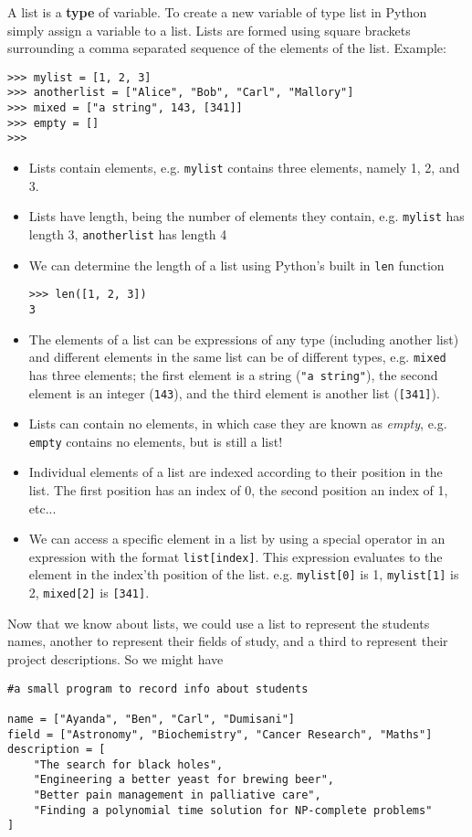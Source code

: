 A list is a \textbf{type} of variable. To create a new   variable of type list in Python simply assign a variable to a list.   Lists are formed using square brackets surrounding a comma separated   sequence of the elements of the list.  Example:
\begin{lstlisting}
>>> mylist = [1, 2, 3]
>>> anotherlist = ["Alice", "Bob", "Carl", "Mallory"]
>>> mixed = ["a string", 143, [341]]
>>> empty = []
>>>
\end{lstlisting}
\begin{itemize}
	\item Lists contain elements, e.g. \texttt{mylist} contains three elements,    namely 1, 2, and 3.
	\item Lists have length, being the number of elements they contain,    e.g. \texttt{mylist} has length 3, \texttt{anotherlist} has length 4
	\item We can determine the length of a list using Python's built in    \texttt{len}    function
\begin{lstlisting}
>>> len([1, 2, 3])
3
\end{lstlisting}
	\item The elements of a list can be expressions of any type    (including another list) and different elements in the same list    can be of different types, e.g. \texttt{mixed} has three elements; the    first element is a string (\texttt{"a string"}), the second element is an    integer (\texttt{143}), and the third element is another list (\texttt{[341]}).
	\item Lists can contain no elements, in which case they are known as    \textit{empty}, e.g. \texttt{empty} contains no elements, but is still a list!
	\item Individual elements of a list are indexed according to their    position in the list. The first position has an index of 0, the    second position an index of 1, etc...
	\item We can access a specific element in a list by using a special    operator in an expression with the format    
\texttt{list[index]}. This expression evaluates to the element    in the index'th position of the list. e.g. 
\texttt{mylist[0]}    is 1, 
\texttt{mylist[1]} is 2, 
\texttt{mixed[2]} is    \texttt{[341]}.
\end{itemize}

Now that we know about lists, we could use a list to represent the   students names, another to represent their fields of study, and a third   to represent their project descriptions. So we might have
\begin{lstlisting}
#a small program to record info about students

name = ["Ayanda", "Ben", "Carl", "Dumisani"]
field = ["Astronomy", "Biochemistry", "Cancer Research", "Maths"]
description = [
    "The search for black holes",
    "Engineering a better yeast for brewing beer",
    "Better pain management in palliative care",
    "Finding a polynomial time solution for NP-complete problems"
]
\end{lstlisting}

